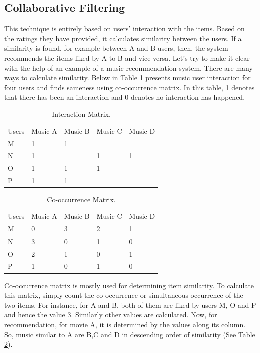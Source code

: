 \documentclass{jot}
\begin{document}
\subsection{Collaborative Filtering}
This technique is entirely based on users' interaction with the items. Based on the ratings they have provided, it calculates similarity between the users. If a similarity is found, for example between A and B users, then, the system recommends the items liked by A to B and vice versa.
Let’s try to make it clear with the help  of an example of a music recommendation system. There are many ways to calculate similarity. Below in Table \ref{tab:collaborative-filtering} presents music user interaction for four users and finds sameness using co-occurrence matrix. In this table, 1 denotes that there has been an interaction and 0 denotes no interaction has happened.

\begin{table}[h!]
\centering
\begin{tabular}{lllll}
Users & Music A & Music B & Music C & Music D \\
M     & 1       & 1       &         &         \\
N     & 1       &         & 1       & 1       \\
O     & 1       & 1       & 1       &         \\
P     & 1       & 1       &         &         \\
\end{tabular}
\caption{Interaction Matrix.}
\label{tab:collaborative-filtering}
\end{table}

\begin{table}[h!]
\centering
\begin{tabular}{lllll}
Users & Music A & Music B & Music C & Music D \\
M     & 0       & 3       & 2       & 1       \\
N     & 3       & 0       & 1       & 0       \\
O     & 2       & 1       & 0       & 1       \\
P     & 1       & 0       & 1       & 0       \\
\end{tabular}
\caption{Co-occurrence Matrix.}
\label{tab:collaborative-filtering2}
\end{table}

Co-occurrence matrix is mostly used for determining item similarity. To calculate this matrix, simply count the co-occurrence or simultaneous occurrence of the two items. For instance, for A and B, both of them are liked by users M, O and P and hence the value 3. Similarly other values are calculated. Now, for recommendation, for movie A, it is determined by the values along its column. So, music similar to A are B,C and D in descending order of similarity (See Table \ref{tab:collaborative-filtering2}).
\end{document}
